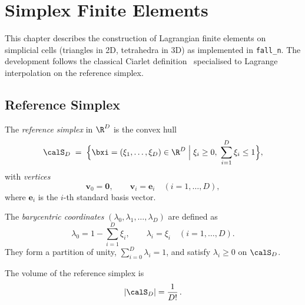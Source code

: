 
\chapter{Simplex Finite Elements}
\label{ch:simplex}

This chapter describes the construction of Lagrangian finite elements on
simplicial cells (triangles in 2D, tetrahedra in 3D) as implemented in
\texttt{fall\_n}.  The development follows the classical Ciarlet
definition~\cite{Ciarlet1972} specialised to Lagrange interpolation on the
reference simplex.


\section{Reference Simplex}
\label{sec:refsimplex}

\begin{definition}
The \emph{reference simplex} in $\R^D$ is the convex hull
\begin{equation}
  \calS_D \;=\; \Bigl\{
    \bxi = (\xi_1, \dots, \xi_D) \in \R^D
    \;\Big|\;
    \xi_i \ge 0,\;
    \sum_{i=1}^{D} \xi_i \le 1
  \Bigr\},
  \label{eq:ref_simplex}
\end{equation}
with \emph{vertices}
\[
  \mathbf{v}_0 = \mathbf{0}, \qquad
  \mathbf{v}_i = \mathbf{e}_i \quad (i = 1, \dots, D),
\]
where $\mathbf{e}_i$ is the $i$-th standard basis vector.
\end{definition}

The \emph{barycentric coordinates} $(\lambda_0, \lambda_1, \dots, \lambda_D)$
are defined as
\begin{equation}
  \lambda_0 = 1 - \sum_{i=1}^{D} \xi_i, \qquad
  \lambda_i = \xi_i \quad (i = 1, \dots, D).
  \label{eq:bary}
\end{equation}
They form a partition of unity, $\sum_{i=0}^{D} \lambda_i = 1$, and satisfy
$\lambda_i \ge 0$ on $\calS_D$.

The volume of the reference simplex is
\begin{equation}
  |\calS_D| = \frac{1}{D!}\,.
  \label{eq:simplex_volume}
\end{equation}


